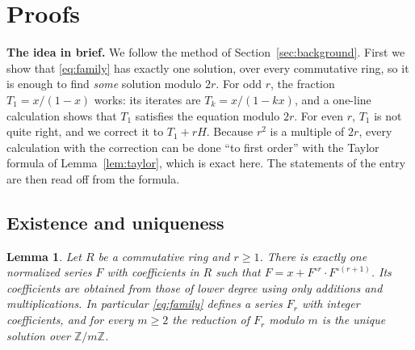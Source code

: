\documentclass[11pt,a4paper]{article}
\newtheorem{lemma}[theorem]{Lemma}
\theoremstyle{definition}
\theoremstyle{remark}
\newcommand{\Z}{\mathbb{Z}}
\newcommand{\para}[1]{\par\medskip\noindent\textbf{#1}\enspace}
\begin{document}
\section{Proofs}\label{sec:proofs}

\para{The idea in brief.} We follow the method of Section~\ref{sec:background}. First we show that
\eqref{eq:family} has exactly one solution, over every commutative ring, so it is enough to find \emph{some} solution
modulo $2r$. For odd $r$, the fraction $T_1=x/(1-x)$ works: its iterates are $T_k=x/(1-kx)$, and a one-line
calculation shows that $T_1$ satisfies the equation modulo $2r$. For even $r$, $T_1$ is not quite right, and we
correct it to $T_1+rH$. Because $r^2$ is a multiple of $2r$, every calculation with the correction can be done
``to first order'' with the Taylor formula of Lemma~\ref{lem:taylor}, which is exact here. The statements of the entry
are then read off from the formula.

\subsection{Existence and uniqueness}

\begin{lemma}\label{lem:unique}
Let $R$ be a commutative ring and $r\ge1$. There is exactly one normalized series $F$ with coefficients in $R$ such
that $F=x+F^{\circ r}\cdot F^{\circ(r+1)}$. Its coefficients are obtained from those of lower degree using only
additions and multiplications. In particular \eqref{eq:family} defines a series $F_r$ with integer coefficients, and
for every $m\ge2$ the reduction of $F_r$ modulo $m$ is the unique solution over $\Z/m\Z$.
\end{lemma}
\end{document}
